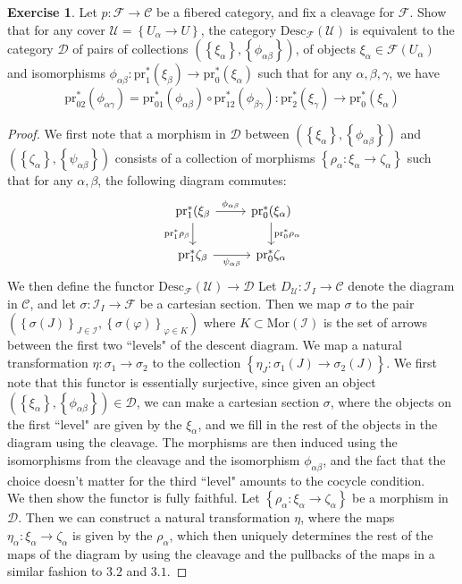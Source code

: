 \documentclass[psamsfonts, 12pt]{amsart}
\theoremstyle{definition}
\newtheorem{exer}[thm]{Exercise}
\theoremstyle{remark}
\newcommand{\set}[1]{\left\lbrace #1 \right\rbrace}
\begin{document}
%
\begin{exer}
Let $p : \mathcal{F} \to \mathcal{C}$ be a fibered category, and fix a cleavage for
$\mathcal{F}$. Show that for any cover $\mathcal{U} = \set{U_\alpha \to U}$,
the category $\mathrm{Desc}_{\mathcal{F}}(\mathcal{U})$ is equivalent to the
category $\mathcal{D}$ of pairs of collections
$(\set{\xi_\alpha}, \set{\phi_{\alpha\beta}})$,
of objects $\xi_\alpha \in \mathcal{F}(U_\alpha)$ and isomorphisms
$\phi_{\alpha\beta} : \mathrm{pr}_1^*(\xi_\beta) \to \mathrm{pr}_0^*(\xi_\alpha)$
such that for any $\alpha,\beta,\gamma$, we have
\[
\mathrm{pr}_{02}^*(\phi_{\alpha\gamma}) =
\mathrm{pr}_{01}^*(\phi_{\alpha\beta}) \circ \mathrm{pr}_{12}^*(\phi_{\beta\gamma}):
\mathrm{pr}_2^*(\xi_\gamma) \to \mathrm{pr}_0^*(\xi_\alpha)
\]
\end{exer}
%
\begin{proof}
We first note that a morphism in $\mathcal{D}$ between
$(\set{\xi_\alpha}, \set{\phi_{\alpha\beta}})$ and
$(\set{\zeta_\alpha}, \set{\psi_{\alpha\beta}})$ consists of a collection of
morphisms $\set{\rho_{\alpha} : \xi_\alpha \to \zeta_\alpha}$ such that for any
$\alpha,\beta$, the following diagram commutes:
\[\begin{tikzcd}
\mathrm{pr}_1^*(\xi_\beta \ar[r, "\phi_{\alpha\beta}"]\ar[d,"\mathrm{pr}_1^*\rho_\beta"']
& \mathrm{pr}_0^*(\xi_\alpha)\ar[d,"\mathrm{pr}_0^*\rho_\alpha"] \\
\mathrm{pr}_1^*\zeta_\beta \ar[r, "\psi_{\alpha\beta}"'] & \mathrm{pr}_0^*\zeta_\alpha
\end{tikzcd}\]
We then define the functor $\mathrm{Desc}_{\mathcal{F}}(\mathcal{U}) \to \mathcal{D}$
Let $D_{\mathcal{U}} : \mathcal{I}_I \to \mathcal{C}$ denote the diagram
in $\mathcal{C}$, and let $\sigma : \mathcal{I}_I \to \mathcal{F}$ be a cartesian
section. Then we map $\sigma$ to the pair
$(\set{\sigma(J)}_{J \in \mathcal{I}}, \set{\sigma(\varphi)}_{\varphi \in K})$
where $K \subset \mathrm{Mor}(\mathcal{I})$ is the set of arrows between the first
two ``levels" of the descent diagram. We map a natural transformation
$\eta : \sigma_1 \to \sigma_2$ to the collection
$\set{\eta_J : \sigma_1(J) \to \sigma_2(J)}$. We first note that this functor
is essentially surjective, since given an object
$(\set{\xi_\alpha}, \set{\phi_{\alpha\beta}}) \in \mathcal{D}$, we can make a
cartesian section $\sigma$, where the objects on the first ``level" are given
by the $\xi_\alpha$, and we fill in the rest of the objects in the diagram using
the cleavage. The morphisms are then induced using the isomorphisms from the cleavage
and the isomorphism $\phi_{\alpha\beta}$, and the fact that the choice doesn't
matter for the third ``level" amounts to the cocycle condition. \\

We then show the functor is fully faithful. Let
$\set{\rho_\alpha : \xi_\alpha \to \zeta_\alpha}$ be a morphism in $\mathcal{D}$.
Then we can construct a natural transformation $\eta$, where the maps
$\eta_\alpha : \xi_\alpha \to \zeta_\alpha$ is given by the $\rho_\alpha$,
which then uniquely determines the rest of the maps of the diagram by using the cleavage
and the pullbacks of the maps in a similar fashion to $3.2$ and $3.1$.
\end{proof}
\end{document}

